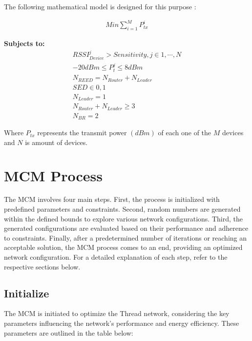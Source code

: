 The following mathematical model is designed for this purpose \cite{girgis2014solving}:

\begin{equation}\label{eq:minimize_power}
    \begin{aligned}
        Min\sum_{i=1}^{M}P_{tx}^i
    \end{aligned}
\end{equation}

\textbf{Subjects to:}
\begin{equation}\label{eq:mathematical_constraints}
    \begin{split}
        RSSI_{Device}^j>Sensitivity,j\in1,\cdots,N \\
        -20dBm{\le P}_t^j\le8dBm \\
        N_{REED}=N_{Router}+N_{Leader} \\
        SED\in0,1 \\
        N_{Leader}=1 \\
        N_{Router}+N_{Leader}\geq3 \\
        N_{BR}=2
    \end{split}
\end{equation}

Where $P_{tx}$ represents the transmit power $(dBm)$ of each one of the $M$ devices and $N$ is amount of devices.

\section{\texorpdfstring{\acrlong{MCM}}{MCM} Process}\label{sec:monte_carlo_method_process}

The \gls{MCM} involves four main steps. First, the process is initialized with predefined parameters and constraints. Second, random numbers are generated within the defined bounds to explore various network configurations. Third, the generated configurations are evaluated based on their performance and adherence to constraints. Finally, after a predetermined number of iterations or reaching an acceptable solution, the \gls{MCM} process comes to an end, providing an optimized network configuration. For a detailed explanation of each step, refer to the respective sections below.

\subsection{Initialize}

The \gls{MCM} is initiated to optimize the Thread network, considering the key parameters influencing the network's performance and energy efficiency. These parameters are outlined in the table below:

